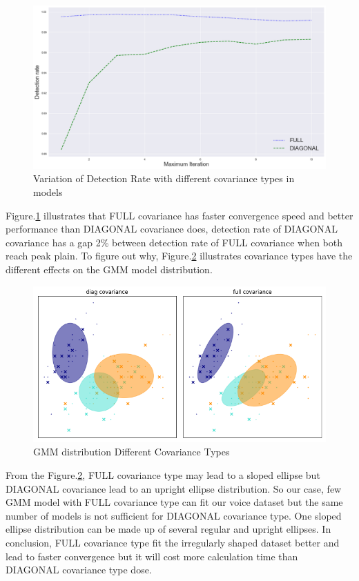 \documentclass[12pt,DIV14,BCOR12mm,a4paper,footinclude=false,headinclude,parskip=half-,twoside,openright,cleardoublepage=empty,toc=index,bibliography=totoc,listof=totoc]{scrreprt}
\numberwithin{equation}{chapter}
\begin{document}
\begin{figure}
	\centering
	\includegraphics[scale=0.4]{image/detect_cov}
	\caption{ Variation of Detection Rate with different covariance types in models}
	\label{detect_cov}
\end{figure}
Figure.\ref{detect_cov} illustrates that FULL covariance has faster convergence speed and better performance than DIAGONAL covariance does, detection rate of DIAGONAL covariance has a gap 2\% between detection rate of FULL covariance when both reach peak plain. To figure out why, Figure.\ref{cov_type} illustrates covariance types have the different effects on the GMM model distribution.

\begin{figure}
	\centering
	\includegraphics[scale=0.5]{image/cov_type}
	\caption{ GMM distribution Different Covariance Types}
	\label{cov_type}
\end{figure}

From the Figure.\ref{cov_type}, FULL covariance type may lead to a sloped ellipse but DIAGONAL covariance lead to an upright ellipse distribution. So our case, few GMM model with FULL covariance type can fit our voice dataset but the same number of models is not sufficient for DIAGONAL covariance type. One sloped ellipse distribution can be made up of several regular and upright ellipses. In conclusion, FULL covariance type fit the irregularly shaped dataset better and lead to faster convergence but it will cost more calculation time than DIAGONAL covariance type dose.
\end{document}
